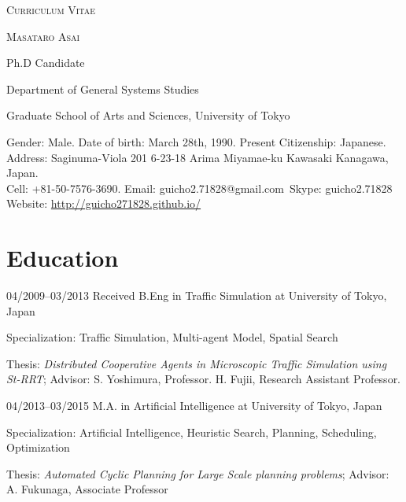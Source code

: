 \documentclass[a4paper]{article}
\begin{document}
\pagestyle{empty}

\begin{center}
\huge{\textsc{Curriculum Vitae}}
\vspace{\baselineskip}

\Large{\textsc{Masataro Asai}}
\vspace{0.5\baselineskip}

\large{
Ph.D Candidate

Department of General Systems Studies

Graduate School of Arts and Sciences, University of Tokyo
}

\vspace{0.8\baselineskip}

\normalsize{
 Gender: Male. Date of birth: March 28th, 1990. Present Citizenship: Japanese. \\
 Address: Saginuma-Viola 201 6-23-18 Arima Miyamae-ku Kawasaki Kanagawa, Japan. \\
 Cell: +81-50-7576-3690. Email: guicho2.71828@gmail.com\ Skype: guicho2.71828\\
 Website: \url{http://guicho271828.github.io/}}
\end{center}


\section{Education}

\begin{CV}
 \item[04/2009--03/2013] Received B.Eng in Traffic Simulation at University of Tokyo, Japan
 
 Specialization: Traffic Simulation, Multi-agent Model, Spatial Search
 
 Thesis: \emph{Distributed Cooperative Agents in Microscopic Traffic
 Simulation using St-RRT}; Advisor: S. Yoshimura, Professor. H. Fujii, Research Assistant Professor.

 \item[04/2013--03/2015] M.A. in Artificial Intelligence at University of Tokyo, Japan

 Specialization: Artificial Intelligence, Heuristic Search, Planning, Scheduling, Optimization

 Thesis: \emph{Automated Cyclic Planning for Large Scale planning problems};
 Advisor: A. Fukunaga, Associate Professor
\end{CV}
\end{document}
